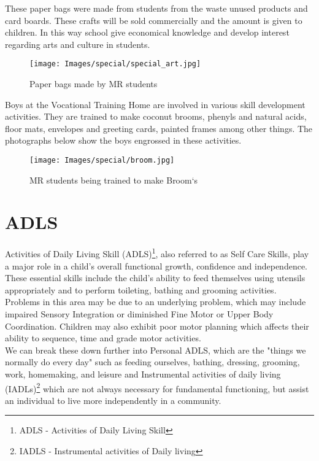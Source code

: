These paper bags were made from students from the waste unused products and card boards. These crafts will be sold commercially and the amount is given to children. In this way school give economical knowledge and develop interest regarding arts and culture in students.

\begin{figure}[H]
    \centering
    \texttt{[image: Images/special/special\_art.jpg]}
    \caption*{Paper bags made by MR students}
\end{figure}

Boys at the Vocational Training Home are involved in various skill development activities. They are trained to make coconut brooms, phenyls and natural acids, floor mats, envelopes and greeting cards, painted frames among other things. The photographs below show the boys engrossed in these activities.

\begin{figure}[H]
    \centering
    \texttt{[image: Images/special/broom.jpg]}
    \caption*{MR students being trained to make Broom`s}
\end{figure}

\section{ADLS}
Activities of Daily Living Skill (ADLS)\footnote{ADLS - Activities of Daily Living Skill}, also referred to as Self Care Skills, play a major role in a child's overall functional growth, confidence and independence. These essential skills include the child's ability to feed themselves using utensils appropriately and to perform toileting, bathing and grooming activities.\\

Problems in this area may be due to an underlying problem, which may include impaired Sensory Integration or diminished Fine Motor or Upper Body Coordination. Children may also exhibit poor motor planning which affects their ability to sequence, time and grade motor activities.\\

We can break these down further into Personal ADLS, which are the "things we normally do every day" such as feeding ourselves, bathing, dressing, grooming, work, homemaking, and leisure and Instrumental activities of daily living (IADLs)\footnote{IADLS - Instrumental activities of Daily living} which are not always necessary for fundamental functioning, but assist an individual to live more independently in a community. \\

